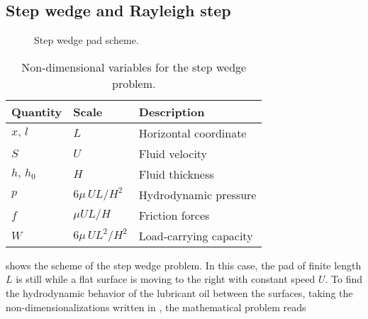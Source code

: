 \subsection{Step wedge and Rayleigh step}
\label{sec:step_rayleigh}
 \begin{figure}[ht]
 \centering 
 \def\svgwidth{\textwidth}	
\caption{Step wedge pad scheme.}\label{fig:step_wedge}	
\end{figure}
\begin{table}[ht]
\centering
\begin{tabular}{lll}
\toprule
Quantity & Scale & Description\\
\midrule
$x,\,l$ & $L$ & Horizontal coordinate \\
$S$ & $U$ & Fluid velocity \\
$h,\,h_0$ & $H$ & Fluid thickness \\
$p$ & $6\mu\, U L/H^2$ & Hydrodynamic pressure\\
$f$ & $\mu U L/H$ & Friction forces\\
$W$ & $6\mu\, U L^2/H^2$ & Load-carrying capacity\\
\bottomrule
\end{tabular}
\caption{Non-dimensional variables for the step wedge problem.}\label{tab:table_non_dim_step}
\end{table}
 shows the scheme of the step wedge problem. In this case, the pad of finite length $L$ is still while a flat surface is moving to the right with constant speed $U$. To find the hydrodynamic behavior of the lubricant oil between the surfaces, taking the non-dimensionalizations written in , the mathematical problem reads

\\

